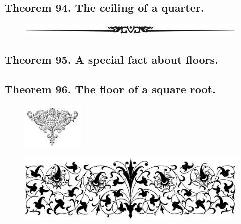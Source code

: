 \documentclass[preview]{standalone}
\begin{document}
\subsection[The ceiling of a quarter.]
    {
        \color{section}Theorem 94. \color{black} The ceiling of a quarter.
    }

\vspace{1.5\baselineskip}
\begin{figure}[!h]
    \centering
    \includegraphics[width=12cm]{../resources/jpg/2.3.functions/border4.jpg}
\end{figure}
\pagebreak


\subsection[A special fact about floors.]
    {
        \color{section}Theorem 95. \color{black} A special fact about floors.
    }

\pagebreak


\subsection[The floor of a square root.]
    {
        \color{section}Theorem 96. \color{black} The floor of a square root.
    }

\begin{figure}[!h]
    \centering
    \includegraphics[width=3cm]{../resources/jpg/2.3.functions/symbol6.jpg}
\end{figure}
\pagebreak


\begin{figure}[!h]
    \centering
    \includegraphics[width=14cm]{../resources/jpg/2.3.functions/border5.jpg}
\end{figure}
\end{document}
